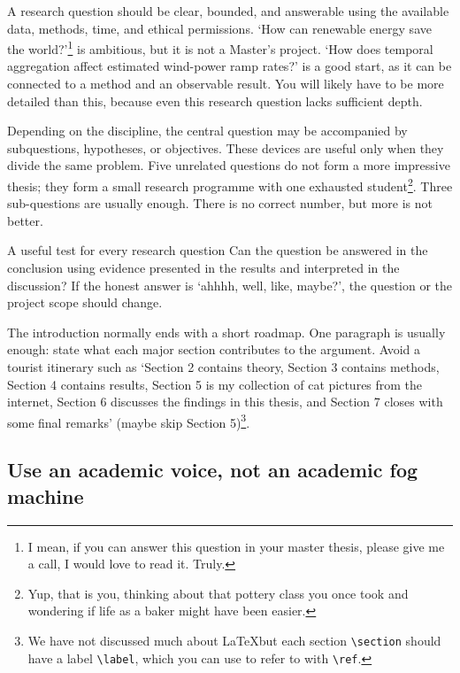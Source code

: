 \documentclass[masters,en,listoffigures,listoftables,acronyms]{NMBU}
\begin{document}
A research question should be clear, bounded, and answerable using the available data, methods, time, and ethical permissions.
`How can renewable energy save the world?'\footnote{I mean, if you can answer this question in your master thesis, please give me a call, I would love to read it. Truly.} is ambitious, but it is not a Master's project.
`How does temporal aggregation affect estimated wind-power ramp rates?' is a good start, as it can be connected to a method and an observable result.
You will likely have to be more detailed than this, because even this research question lacks sufficient depth.

Depending on the discipline, the central question may be accompanied by subquestions, hypotheses, or objectives.
These devices are useful only when they divide the same problem.
Five unrelated questions do not form a more impressive thesis; they form a small research programme with one exhausted student\footnote{Yup, that is you, thinking about that pottery class you once took and wondering if life as a baker might have been easier.}.
Three sub-questions are usually enough.
There is no correct number, but more is not better.

\begin{thesispoint}{A useful test for every research question}
Can the question be answered in the conclusion using evidence presented in the results and interpreted in the discussion? If the honest answer is `ahhhh, well, like, maybe?', the question or the project scope should change.
\end{thesispoint}

The introduction normally ends with a short roadmap.
One paragraph is usually enough: state what each major section contributes to the argument.
Avoid a tourist itinerary such as `Section 2 contains theory, Section 3 contains methods, Section 4 contains results, Section 5 is my collection of cat pictures from the internet, Section 6 discusses the findings in this thesis, and Section 7 closes with some final remarks' (maybe skip Section 5)\footnote{We have not discussed much about \LaTeX but each section \texttt{\textbackslash section} should have a label \texttt{\textbackslash label}, which you can use to refer to with \texttt{\textbackslash ref}.}.

\subsection{Use an academic voice, not an academic fog machine}
\end{document}
